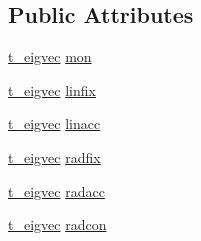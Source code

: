 \subsection*{\-Public \-Attributes}
\begin{DoxyCompactItemize}
\item 
\hyperlink{structt__eigvec}{t\-\_\-eigvec} \hyperlink{structt__edvecs_ac42e8b859abc51dd429d3edb7f71ffe9}{mon}
\item 
\hyperlink{structt__eigvec}{t\-\_\-eigvec} \hyperlink{structt__edvecs_a801ce367f7f84a6e7817fe3977806ea4}{linfix}
\item 
\hyperlink{structt__eigvec}{t\-\_\-eigvec} \hyperlink{structt__edvecs_a4cf53dd2c3e4911cacdbaaf098755199}{linacc}
\item 
\hyperlink{structt__eigvec}{t\-\_\-eigvec} \hyperlink{structt__edvecs_a42b3688bc4b13975b1a0850cbb3ef7a7}{radfix}
\item 
\hyperlink{structt__eigvec}{t\-\_\-eigvec} \hyperlink{structt__edvecs_ac76fac11480df899ec55dece55a4b1f3}{radacc}
\item 
\hyperlink{structt__eigvec}{t\-\_\-eigvec} \hyperlink{structt__edvecs_a7d11ab497da4ead41461976c89743f96}{radcon}
\end{DoxyCompactItemize}


